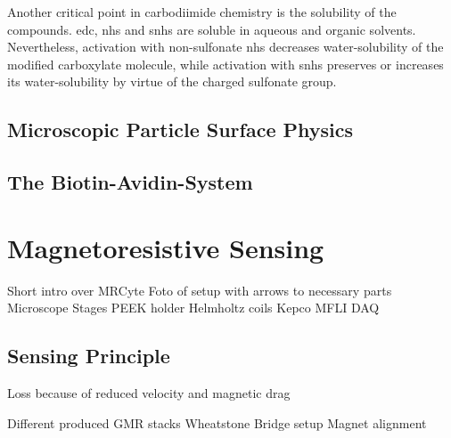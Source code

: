 Another critical point in carbodiimide chemistry is the solubility of the compounds. \gls{edc}, \gls{nhs} and \gls{snhs} are soluble in aqueous and organic solvents. Nevertheless, activation  with  non-sulfonate \gls{nhs} decreases water-solubility of the modified carboxylate molecule, while activation with \gls{snhs} preserves or increases its water-solubility by virtue of the charged sulfonate group. \cite{lit:chem:snhs}

\clearpage

\subsection{Microscopic Particle Surface Physics}

\subsection{The Biotin-Avidin-System}


\section{Magnetoresistive Sensing}
Short intro over MRCyte
Foto of setup with arrows to necessary parts
Microscope
Stages
PEEK holder
Helmholtz coils
Kepco
MFLI
DAQ



\subsection{Sensing Principle}

Loss because of reduced velocity and magnetic drag

Different produced GMR stacks
Wheatstone Bridge setup
Magnet alignment

